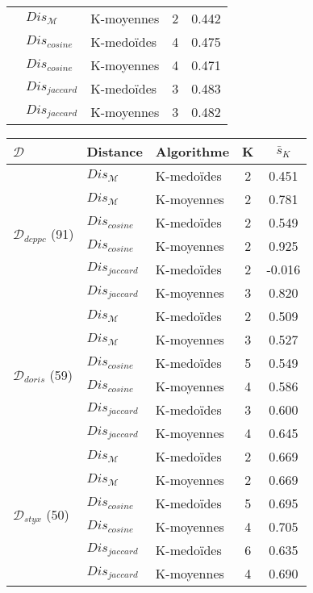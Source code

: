 \begin{table}[!htb]
\begin{center}
\begin{subfigure}[ht]{0.49\textwidth}
\begin{tabular}[pos]{|l|l|l|c|c|}
	& $Dis_\mathcal{M}$ & K-moyennes & 2 & 0.442  \\ \cline{2-5}
	& $Dis_{cosine}$ & K-medoïdes & 4 & 0.475 \\ \cline{2-5}
	& $Dis_{cosine}$ & K-moyennes & 4 & 0.471  \\ \cline{2-5}
	& $Dis_{jaccard}$ & K-medoïdes & 3 & 0.483 \\ \cline{2-5}
	& $Dis_{jaccard}$ & K-moyennes & 3 & 0.482 \\ \hline
\end{tabular}
	\end{subfigure}
	\begin{subfigure}[ht]{0.49\textwidth}
		\begin{tabular}[pos]{|l|l|l|c|c|}
			\hline
			$\mathcal{D}$& {Distance} & {Algorithme}& {K}  & $\bar{s}_K$ \\ \hline
	\multirow{6}{\mrcell}{$\mathcal{D}_{dcppc}$ (91)} & $Dis_\mathcal{M}$ & K-medoïdes & 2 & 0.451  \\ \cline{2-5}
	& $Dis_\mathcal{M}$  & K-moyennes & 2 & 0.781  \\ \cline{2-5}
	& $Dis_{cosine}$ & K-medoïdes & 2 & 0.549 \\ \cline{2-5}
	& $Dis_{cosine}$ & K-moyennes & 2 & 0.925 \\ \cline{2-5}
	& $Dis_{jaccard}$ & K-medoïdes & 2 & -0.016  \\ \cline{2-5}
	& $Dis_{jaccard}$ & K-moyennes & 3 & 0.820 \\ \hline
	\multirow{6}{\mrcell}{$\mathcal{D}_{doris}$ (59)}  & $Dis_\mathcal{M}$ & K-medoïdes & 2 & 0.509  \\ \cline{2-5}
	& $Dis_\mathcal{M}$ & K-moyennes & 3 & 0.527  \\ \cline{2-5}
	& $Dis_{cosine}$ & K-medoïdes & 5 & 0.549 \\ \cline{2-5}
	& $Dis_{cosine}$ & K-moyennes & 4 & 0.586 \\ \cline{2-5}
	& $Dis_{jaccard}$ & K-medoïdes & 3 & 0.600 \\ \cline{2-5}
	& $Dis_{jaccard}$ & K-moyennes & 4 & 0.645 
	\\ \hline
	\multirow{6}{\mrcell}{$\mathcal{D}_{styx}$ (50)}  & $Dis_\mathcal{M}$ & K-medoïdes & 2 & 0.669 \\ \cline{2-5}
	& $Dis_\mathcal{M}$ & K-moyennes & 2 & 0.669 \\ \cline{2-5}
	& $Dis_{cosine}$ & K-medoïdes & 5 & 0.695 \\ \cline{2-5}
	& $Dis_{cosine}$ & K-moyennes & 4 & 0.705 \\ \cline{2-5}
	& $Dis_{jaccard}$ & K-medoïdes & 6 & 0.635 \\ \cline{2-5}
	& $Dis_{jaccard}$  & K-moyennes & 4 & 0.690 \\ \hline
	\end{tabular}
	\end{subfigure}
\end{center}


\end{table}
